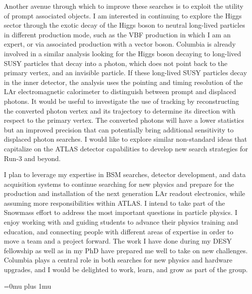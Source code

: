 \documentclass[a4paper]{article}
\begin{document}
Another avenue through which to improve these searches is to exploit the utility of prompt associated objects. I am interested in continuing to explore the Higgs sector through the exotic decay of the Higgs boson to neutral long-lived particles in different production mode, such as the VBF production in which I am an expert, or via associated production with a vector boson. Columbia is already involved in a similar analysis looking for the Higgs boson decaying to long-lived SUSY particles that decay into a photon, which does not point back to the primary vertex, and an invisible particle. If these long-lived SUSY particles decay in the inner detector, the analysis uses the pointing and timing resolution of the LAr electromagnetic calorimeter to distinguish between prompt and displaced photons. It would be useful to investigate the use of tracking by reconstructing the converted photon vertex and its trajectory to determine its direction with respect to the primary vertex. The converted photons will have a lower statistics but an improved precision that can potentially bring additional sensitivity to displaced photon searches. I would like to explore similar non-standard ideas that capitalize on the ATLAS detector capabilities to develop new search strategies for Run-3 and beyond.

\bigskip


I plan to leverage my expertise in BSM searches, detector development, and data acquisition systems to continue searching for new physics and
prepare for the production and installation of the next generation LAr readout electronics, while assuming more responsibilities within ATLAS.  I intend to take part of the Snowmass effort to address the most important questions in particle physics. I enjoy working with and guiding students to advance their physics training and education, and connecting people with different areas of expertise in order to move a team and a project forward. The work I have done during my DESY fellowship as well as in my PhD have prepared me well to take on new challenges. Columbia plays a central role in both searches for new physics and hardware upgrades, and I would be delighted to work, learn, and grow as part of the group.



\Urlmuskip=0mu plus 1mu\relax
{%
\fontsize{11}{14}
\selectfont
}{}

\end{document}
